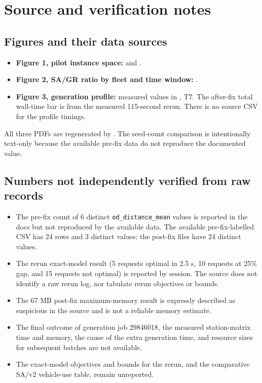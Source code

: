 \section{Source and verification notes}

\subsection{Figures and their data sources}

\begin{itemize}
\item \textbf{Figure 1, pilot instance space:}
   and
  .
\item \textbf{Figure 2, SA/GR ratio by fleet and time window:}
  .
\item \textbf{Figure 3, generation profile:}
  measured values in , T7. The
  after-fix total wall-time bar is from the measured 115-second rerun. There is
  no source CSV for the profile timings.
\end{itemize}

All three PDFs are regenerated by . The seed-count
comparison is intentionally text-only because the available pre-fix data do
not reproduce the documented value.

\subsection{Numbers not independently verified from raw records}

\begin{itemize}
\item The pre-fix count of 6 distinct \texttt{od\_distance\_mean} values is
  reported in the docs but not reproduced by the available data. The available
  pre-fix-labelled CSV has 24 rows and 3 distinct values; the post-fix files
  have 24 distinct values.
\item The rerun exact-model result (5 requests optimal in 2.5 s, 10 requests
  at 25\% gap, and 15 requests not optimal) is reported by session. The source
  does not identify a raw rerun log, nor tabulate rerun objectives or bounds.
\item The 67 MB post-fix maximum-memory result is expressly described as
  suspicious in the source and is not a reliable memory estimate.
\item The final outcome of generation job 29846018, the measured station-matrix
  time and memory, the cause of the extra generation time, and resource sizes
  for subsequent batches are not available.
\item The exact-model objectives and bounds for the rerun, and the comparative
  SA/v2 vehicle-use table, remain unreported.
\end{itemize}

